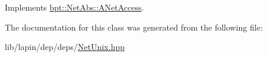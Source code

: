 Implements \hyperlink{classbpt_1_1_net_abs_1_1_a_net_access_aa9e29deb2022f7eb601554990a8d452a}{bpt\-::\-Net\-Abs\-::\-A\-Net\-Access}.



The documentation for this class was generated from the following file\-:\begin{DoxyCompactItemize}
\item 
lib/lapin/dep/deps/\hyperlink{_net_unix_8hpp}{Net\-Unix.\-hpp}\end{DoxyCompactItemize}
